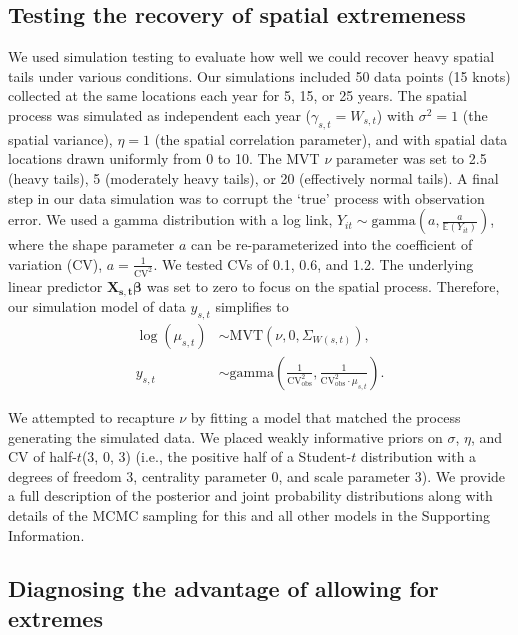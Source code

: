 \documentclass[12pt,english]{article}
\begin{document}
\begin{spacing}{1.9}
\subsection{Testing the recovery of spatial extremeness}
\label{sec:testing-recovery}

We used simulation testing to evaluate how well we could recover
heavy spatial tails under various conditions.
Our simulations included 50 data points (15 knots) collected at the same
locations each year for 5, 15, or 25 years. The spatial process was simulated
as independent each year ($\gamma_{s,t} = W_{s,t}$) with $\sigma^2 = 1$
(the spatial variance),
$\eta = 1$ (the spatial correlation parameter), and
with spatial data locations drawn uniformly from 0 to 10.
The MVT $\nu$ parameter was set to 2.5 (heavy tails), 5 (moderately
heavy tails), or 20 (effectively normal tails). A final step in our data
simulation was to corrupt the `true' process with observation error. We used a gamma
distribution with a log link, $Y_{it}\sim \mathrm{gamma}\left(a,\frac
  {a}{\mathbb{E}(Y_{it})} \right)$, where the shape parameter $a$ can be
re-parameterized into the coefficient of variation (CV),
$a=\frac{1}{\mathrm{CV}^2}$. We tested CVs of 0.1, 0.6, and 1.2. The underlying
linear predictor $\bm{X_{s,t}} \bm{\beta}$ was set to zero to focus on the
spatial process. Therefore, our simulation model of data $y_{s,t}$ simplifies to
\begin{align}
  \log(\mu_{s,t}) &\sim \mathrm{MVT}\left(\nu, 0, \Sigma_{W(s,t)}\right),\\
  y_{s,t} &\sim \mathrm{gamma} \left( \frac{1}{\mathrm{CV}_\mathrm{obs}^2},
  \frac{1}{\mathrm{CV}_\mathrm{obs}^2 \cdot \mu_{s,t} } \right).
\end{align}

We attempted to recapture $\nu$ by fitting a model that matched the process
generating the simulated data. We placed weakly informative priors on $\sigma$,
$\eta$, and CV of half-$t$(3, 0, 3) (i.e., the positive half of a Student-$t$
distribution with a degrees of freedom 3, centrality parameter 0, and scale
parameter 3). We provide a full description of the posterior and joint
probability distributions along with details of the MCMC sampling for this and
all other models in the Supporting Information.

\subsection{Diagnosing the advantage of allowing for extremes}
\label{sec:diagnosing}


\end{spacing}
\end{document}
